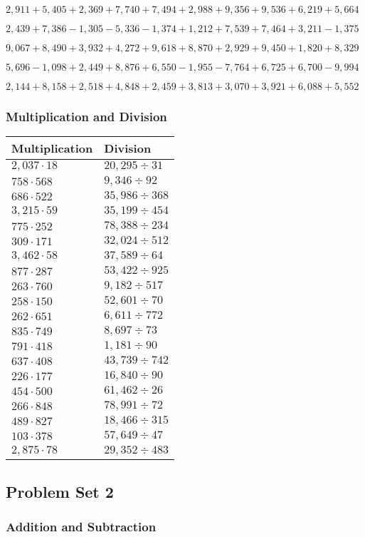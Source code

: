 \(2,911+5,405+2,369+7,740+7,494+2,988+9,356+9,536+6,219+5,664\)

\(2,439+7,386-1,305-5,336-1,374+1,212+7,539+7,464+3,211-1,375\)

\(9,067+8,490+3,932+4,272+9,618+8,870+2,929+9,450+1,820+8,329\)

\(5,696-1,098+2,449+8,876+6,550-1,955-7,764+6,725+6,700-9,994\)

\(2,144+8,158+2,518+4,848+2,459+3,813+3,070+3,921+6,088+5,552\)

\hypertarget{multiplication-and-division-162}{%
\subsubsection{Multiplication and
Division}\label{multiplication-and-division-162}}

\begin{longtable}[]{@{}ll@{}}
\toprule
Multiplication & Division\tabularnewline
\midrule
\endhead
\(2,037\cdot18\) & \(20,295÷31\)\tabularnewline
\(758\cdot568\) & \(9,346÷92\)\tabularnewline
\(686\cdot522\) & \(35,986÷368\)\tabularnewline
\(3,215\cdot59\) & \(35,199÷454\)\tabularnewline
\(775\cdot252\) & \(78,388÷234\)\tabularnewline
\(309\cdot171\) & \(32,024÷512\)\tabularnewline
\(3,462\cdot58\) & \(37,589÷64\)\tabularnewline
\(877\cdot287\) & \(53,422÷925\)\tabularnewline
\(263\cdot760\) & \(9,182÷517\)\tabularnewline
\(258\cdot150\) & \(52,601÷70\)\tabularnewline
\(262\cdot651\) & \(6,611÷772\)\tabularnewline
\(835\cdot749\) & \(8,697÷73\)\tabularnewline
\(791\cdot418\) & \(1,181÷90\)\tabularnewline
\(637\cdot408\) & \(43,739÷742\)\tabularnewline
\(226\cdot177\) & \(16,840÷90\)\tabularnewline
\(454\cdot500\) & \(61,462÷26\)\tabularnewline
\(266\cdot848\) & \(78,991÷72\)\tabularnewline
\(489\cdot827\) & \(18,466÷315\)\tabularnewline
\(103\cdot378\) & \(57,649÷47\)\tabularnewline
\(2,875\cdot78\) & \(29,352÷483\)\tabularnewline
\bottomrule
\end{longtable}

\hypertarget{problem-set-2-3}{%
\subsection{Problem Set 2}\label{problem-set-2-3}}

\hypertarget{addition-and-subtraction-164}{%
\subsubsection{Addition and
Subtraction}\label{addition-and-subtraction-164}}

